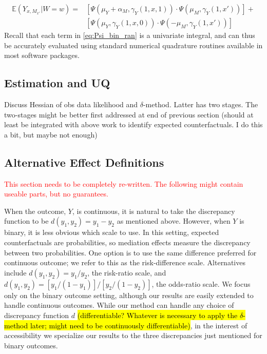 \documentclass{article}
\newcommand{\bE}{\mathbb{E}}
\begin{document}
%
\begin{align}
    \bE (Y_{x, M_{x'}} | W=w) = & \left[  \Psi(\mu_Y + \alpha_M, \gamma_Y(1, x, 1)) \cdot \Psi(\mu_M , \gamma_Y(1, x')) \right] + \label{eq:Psi_bin_ran}\\
    & \left[ \Psi(\mu_Y, \gamma_Y(1, x, 0)) \cdot \Psi(- \mu_M , \gamma_Y(1, x')) \right] \nonumber
\end{align}
%
Recall that each term in \eqref{eq:Psi_bin_ran} is a univariate integral, and can thus be accurately evaluated using standard numerical quadrature routines available in most software packages.

\subsection{Estimation and UQ}

Discuss Hessian of obs data likelihood and $\delta$-method. Latter has two stages. The two-stages might be better first addressed at end of previous section (should at least be integrated with above work to identify expected counterfactuals. I do this a bit, but maybe not enough)




\subsection{Alternative Effect Definitions}

\textcolor{red}{This section needs to be completely re-written. The following might contain useable parts, but no guarantees.}

When the outcome, $Y$, is continuous, it is natural to take the discrepancy function to be $d(y_1, y_2) = y_1 - y_2$ as mentioned above. However, when $Y$ is binary, it is less obvious which scale to use. In this setting, expected counterfactuals are probabilities, so mediation effects measure the discrepancy between two probabilities. One option is to use the same difference preferred for continuous outcome; we refer to this as the risk-difference scale. Alternatives include $d(y_1, y_2) = y_1 / y_2$, the risk-ratio scale, and $d(y_1, y_2) = [y_1 / (1 - y_1)] / [y_2 / (1 - y_2)]$, the odds-ratio scale. We focus only on the binary outcome setting, although our results are easily extended to handle continuous outcomes. While our method can handle any choice of discrepancy function $d$ \hl{(differentiable? Whatever is necessary to apply the $\delta$-method later; might need to be continuously differentiable)}, in the interest of accessibility we specialize our results to the three discrepancies just mentioned for binary outcomes.
\end{document}
